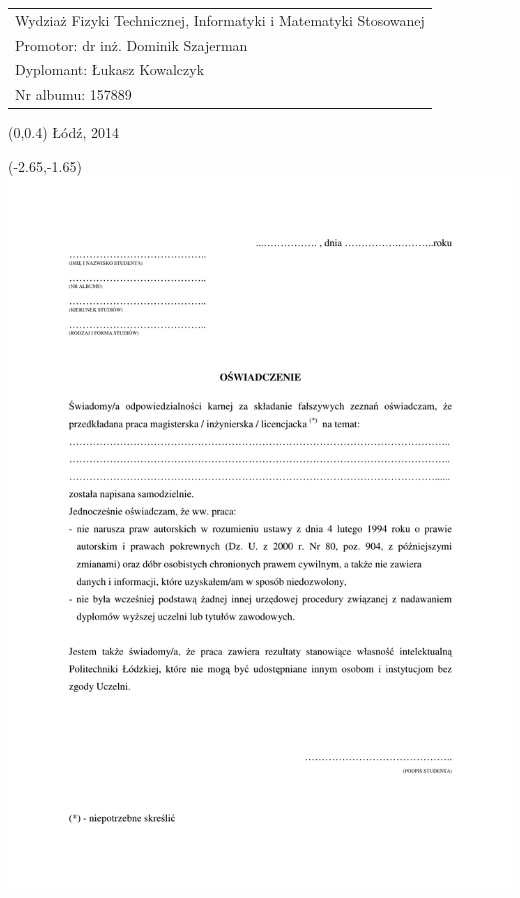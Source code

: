 \documentclass[12pt, oneside, a4paper]{mwbk}
\begin{document}
\begin{titlepage}
\begin{center}
\selectfont
\hspace{-1cm}
\begin{tabular}{l}
Wydziaż Fizyki Technicznej, Informatyki i Matematyki Stosowanej \\
Promotor: dr inż. Dominik Szajerman \\
Dyplomant: Łukasz Kowalczyk \\
Nr albumu: 157889
\end{tabular}
\end{center}
\vspace{-.5cm}
\begin{center}
\selectfont
\begin{textblock}{13}(0,0.4)
Łódź, 2014
\end{textblock}
\end{center}
\end{titlepage}

\tableofcontents











\listoffigures

\listoftables

\newpage
\thispagestyle{empty}
\begin{textblock}{1}(-2.65,-1.65)
\includegraphics{figures/oswiadczenie_o_samodzielnosci.pdf}
\end{textblock}
\end{document}
